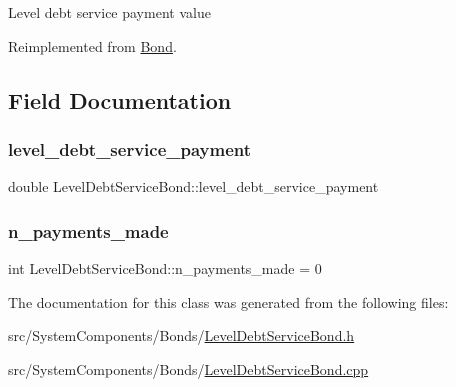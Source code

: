 Level debt service payment value 

Reimplemented from \mbox{\hyperlink{classBond_a377db8c18b83c4666e46686bc26adef1_a377db8c18b83c4666e46686bc26adef1}{Bond}}.



\subsection{Field Documentation}
\mbox{\label{classLevelDebtServiceBond_a2af3b9ff7546bd002f78d07dbf696c64_a2af3b9ff7546bd002f78d07dbf696c64}} 
\subsubsection{\texorpdfstring{level\+\_\+debt\+\_\+service\+\_\+payment}{level\_debt\_service\_payment}}
{\footnotesize\ttfamily double Level\+Debt\+Service\+Bond\+::level\+\_\+debt\+\_\+service\+\_\+payment\hspace{0.3cm}{\ttfamily [private]}}

\mbox{\label{classLevelDebtServiceBond_ad1b8ba91ef3702a5eecfe3075fed0bc3_ad1b8ba91ef3702a5eecfe3075fed0bc3}} 
\subsubsection{\texorpdfstring{n\+\_\+payments\+\_\+made}{n\_payments\_made}}
{\footnotesize\ttfamily int Level\+Debt\+Service\+Bond\+::n\+\_\+payments\+\_\+made = 0\hspace{0.3cm}{\ttfamily [private]}}



The documentation for this class was generated from the following files\+:\begin{DoxyCompactItemize}
\item 
src/\+System\+Components/\+Bonds/\mbox{\hyperlink{LevelDebtServiceBond_8h}{Level\+Debt\+Service\+Bond.\+h}}\item 
src/\+System\+Components/\+Bonds/\mbox{\hyperlink{LevelDebtServiceBond_8cpp}{Level\+Debt\+Service\+Bond.\+cpp}}\end{DoxyCompactItemize}
